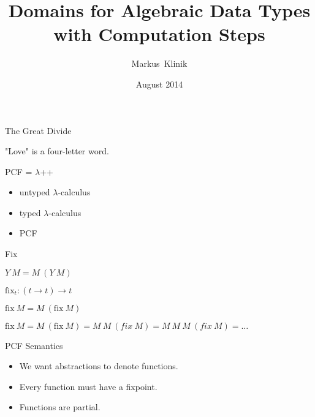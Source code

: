 \documentclass{beamer}
\title
{Domains for Algebraic Data Types with Computation Steps}
\author
{Markus~Klinik}
\institute[Radboud University Nijmegen]
{
  Radboud University Nijmegen
}
\date
{August 2014}
\newcommand{\fix}{\text{fix}}
\newcommand{\arr}{\rightarrow}
\begin{document}
\begin{frame}
  \titlepage
\end{frame}



\begin{frame}{The Great Divide}

"Love" is a four-letter word.

\end{frame}




\begin{frame}{PCF = $\lambda$++}


\begin{itemize}
\item untyped $\lambda$-calculus
\item typed $\lambda$-calculus
\item PCF
\end{itemize}




\end{frame}


\begin{frame}{Fix}


\begin{center}

\onslide<+->
$Y\ M = M\ (Y\ M)$
\vspace{1em}

\onslide<+->
$\fix_t : (t \arr t) \arr t$
\vspace{1em}

$\fix\ M = M\ (\fix\ M)$
\vspace{1em}

\onslide<+->

$\fix\ M = M\ (\fix\ M) = M\ M\ (fix\ M) = M\ M\ M\ (fix\ M) = \ldots$
\end{center}


\end{frame}



\begin{frame}{PCF Semantics}
\begin{itemize}
\item We want abstractions to denote functions.
\item Every function must have a fixpoint.
\item Functions are partial.
\end{itemize}
\end{frame}
\end{document}
